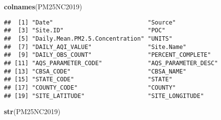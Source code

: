 \documentclass[]{article}
\newenvironment{Shaded}{\begin{snugshade}}{\end{snugshade}}
\newcommand{\KeywordTok}[1]{\textcolor[rgb]{0.13,0.29,0.53}{\textbf{#1}}}
\newcommand{\NormalTok}[1]{#1}
\begin{document}
\begin{Shaded}
\begin{Highlighting}[]
\KeywordTok{colnames}\NormalTok{(PM25NC2019)}
\end{Highlighting}
\end{Shaded}

\begin{verbatim}
##  [1] "Date"                           "Source"                        
##  [3] "Site.ID"                        "POC"                           
##  [5] "Daily.Mean.PM2.5.Concentration" "UNITS"                         
##  [7] "DAILY_AQI_VALUE"                "Site.Name"                     
##  [9] "DAILY_OBS_COUNT"                "PERCENT_COMPLETE"              
## [11] "AQS_PARAMETER_CODE"             "AQS_PARAMETER_DESC"            
## [13] "CBSA_CODE"                      "CBSA_NAME"                     
## [15] "STATE_CODE"                     "STATE"                         
## [17] "COUNTY_CODE"                    "COUNTY"                        
## [19] "SITE_LATITUDE"                  "SITE_LONGITUDE"
\end{verbatim}

\begin{Shaded}
\begin{Highlighting}[]
\KeywordTok{str}\NormalTok{(PM25NC2019)}
\end{Highlighting}
\end{Shaded}
\end{document}

